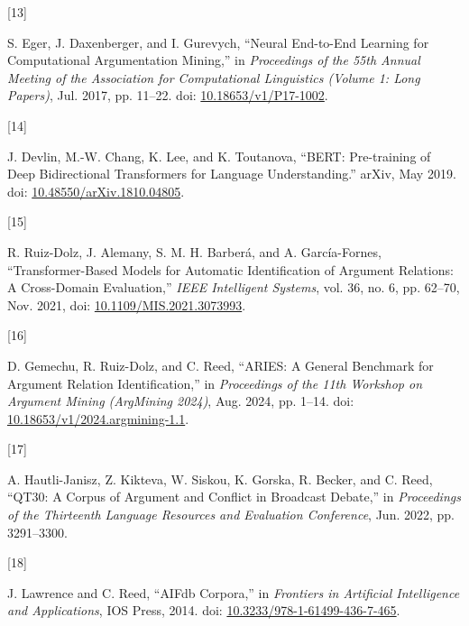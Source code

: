 \documentclass[twocolumn]{article}
\newlength{\cslhangindent}
\newlength{\csllabelwidth}
\newenvironment{CSLReferences}[2] %
 {\begin{list}{}{%
  \setlength{\itemindent}{0pt}
  \setlength{\leftmargin}{0pt}
  \setlength{\parsep}{0pt}
  \ifodd #1
   \setlength{\leftmargin}{\cslhangindent}
   \setlength{\itemindent}{-1\cslhangindent}
  \fi
  \setlength{\itemsep}{#2\baselineskip}}}
 {\end{list}}
\newcommand{\CSLLeftMargin}[1]{\parbox[t]{\csllabelwidth}{\strut#1\strut}}
\newcommand{\CSLRightInline}[1]{\parbox[t]{\linewidth - \csllabelwidth}{\strut#1\strut}}
\begin{document}
\begin{CSLReferences}{0}{0}
\CSLLeftMargin{{[}13{]} }%
\CSLRightInline{S. Eger, J. Daxenberger, and I. Gurevych, {``Neural
{End-to-End Learning} for {Computational Argumentation Mining},''} in
\emph{Proceedings of the 55th {Annual Meeting} of the {Association} for
{Computational Linguistics} ({Volume} 1: {Long Papers})}, Jul. 2017, pp.
11--22. doi:
\href{https://doi.org/10.18653/v1/P17-1002}{10.18653/v1/P17-1002}.}

\CSLLeftMargin{{[}14{]} }%
\CSLRightInline{J. Devlin, M.-W. Chang, K. Lee, and K. Toutanova,
{``{BERT}: {Pre-training} of {Deep Bidirectional Transformers} for
{Language Understanding}.''} arXiv, May 2019. doi:
\href{https://doi.org/10.48550/arXiv.1810.04805}{10.48550/arXiv.1810.04805}.}

\CSLLeftMargin{{[}15{]} }%
\CSLRightInline{R. Ruiz-Dolz, J. Alemany, S. M. H. Barberá, and A.
García-Fornes, {``Transformer-{Based Models} for {Automatic
Identification} of {Argument Relations}: {A Cross-Domain Evaluation},''}
\emph{IEEE Intelligent Systems}, vol. 36, no. 6, pp. 62--70, Nov. 2021,
doi:
\href{https://doi.org/10.1109/MIS.2021.3073993}{10.1109/MIS.2021.3073993}.}

\CSLLeftMargin{{[}16{]} }%
\CSLRightInline{D. Gemechu, R. Ruiz-Dolz, and C. Reed, {``{ARIES}: {A
General Benchmark} for {Argument Relation Identification},''} in
\emph{Proceedings of the 11th {Workshop} on {Argument Mining}
({ArgMining} 2024)}, Aug. 2024, pp. 1--14. doi:
\href{https://doi.org/10.18653/v1/2024.argmining-1.1}{10.18653/v1/2024.argmining-1.1}.}

\CSLLeftMargin{{[}17{]} }%
\CSLRightInline{A. Hautli-Janisz, Z. Kikteva, W. Siskou, K. Gorska, R.
Becker, and C. Reed, {``{QT30}: {A Corpus} of {Argument} and {Conflict}
in {Broadcast Debate},''} in \emph{Proceedings of the {Thirteenth
Language Resources} and {Evaluation Conference}}, Jun. 2022, pp.
3291--3300.}

\CSLLeftMargin{{[}18{]} }%
\CSLRightInline{J. Lawrence and C. Reed, {``{AIFdb Corpora},''} in
\emph{Frontiers in {Artificial Intelligence} and {Applications}}, IOS
Press, 2014. doi:
\href{https://doi.org/10.3233/978-1-61499-436-7-465}{10.3233/978-1-61499-436-7-465}.}


\end{CSLReferences}
\end{document}
